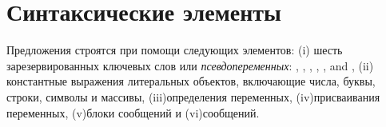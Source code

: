 \documentclass[a4paper,10pt,twoside]{book}
\begin{document}
\section{Синтаксические элементы}

Предложения строятся при помощи следующих элементов:
(i) шесть зарезервированных ключевых слов или \emph{псевдопеременных}:
, , , , , and ,
(ii) константные выражения литеральных объектов, включающие числа, буквы, строки, символы и массивы,
(iii)определения переменных,
(iv)присваивания переменных,
(v)блоки сообщений и
(vi)сообщений.
\end{document}
